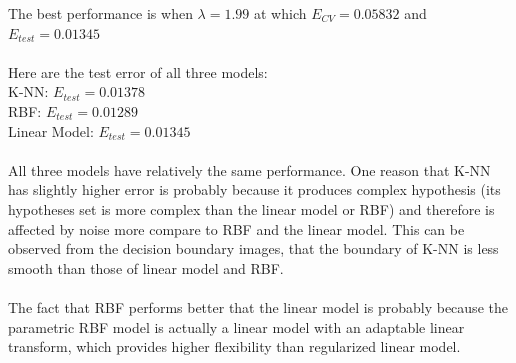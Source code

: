 \documentclass[12pt]{article}
\begin{document}
The best performance is when $\lambda=1.99$ at which $E_{CV}=0.05832$ and $E_{test}=0.01345$\\\\
Here are the test error of all three models:\\
K-NN: $E_{test}=0.01378$\\
RBF: $E_{test}=0.01289$\\
Linear Model: $E_{test}=0.01345$\\\\
All three models have relatively the same performance. One reason that K-NN has slightly higher error is probably because it produces complex hypothesis (its hypotheses set is more complex than the linear model or RBF) and therefore is affected by noise more compare to RBF and the linear model. This can be observed from the decision boundary images, that the boundary of K-NN is less smooth than those of linear model and RBF. \\\\
The fact that RBF performs better that the linear model is probably because the parametric RBF model is actually a linear model with an adaptable linear transform, which provides higher flexibility than regularized linear model. \\
\end{document}
